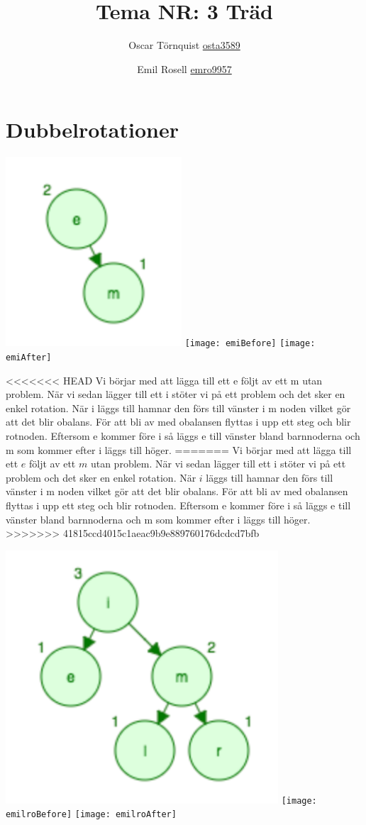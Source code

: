 \documentclass[a5paper,10pt,oneside]{article}
\title{Tema NR: 3 Träd}
\author{Oscar Törnquist \url{osta3589} \and Emil Rosell \url{emro9957}}
\begin{document}
\maketitle

\section*{Dubbelrotationer}

\includegraphics[scale=0.7]{em}
\texttt{[image: emiBefore]}
\texttt{[image: emiAfter]}

<<<<<<< HEAD
Vi börjar med att lägga till ett e följt av ett m utan problem. När vi sedan lägger till ett i stöter vi på ett problem och det sker en enkel rotation. När i läggs till hamnar den förs till vänster i m noden vilket gör att det blir obalans. För att bli av med obalansen flyttas i upp ett steg och blir rotnoden. Eftersom e kommer före i så läggs e till vänster bland barnnoderna och m som kommer efter i läggs till höger. 
=======
Vi börjar med att lägga till ett $e$ följt av ett $m$ utan problem. När vi sedan lägger till ett i stöter vi på ett problem och det sker en enkel rotation. När $i$ läggs till hamnar den förs till vänster i m noden vilket gör att det blir obalans. För att bli av med obalansen flyttas i upp ett steg och blir rotnoden. Eftersom e kommer före i så läggs e till vänster bland barnnoderna och m som kommer efter i läggs till höger. 
>>>>>>> 41815ccd4015c1aeac9b9e889760176dcdcd7bfb

\includegraphics[scale=0.45]{emilr}
\texttt{[image: emilroBefore]}
\texttt{[image: emilroAfter]}
\end{document}
